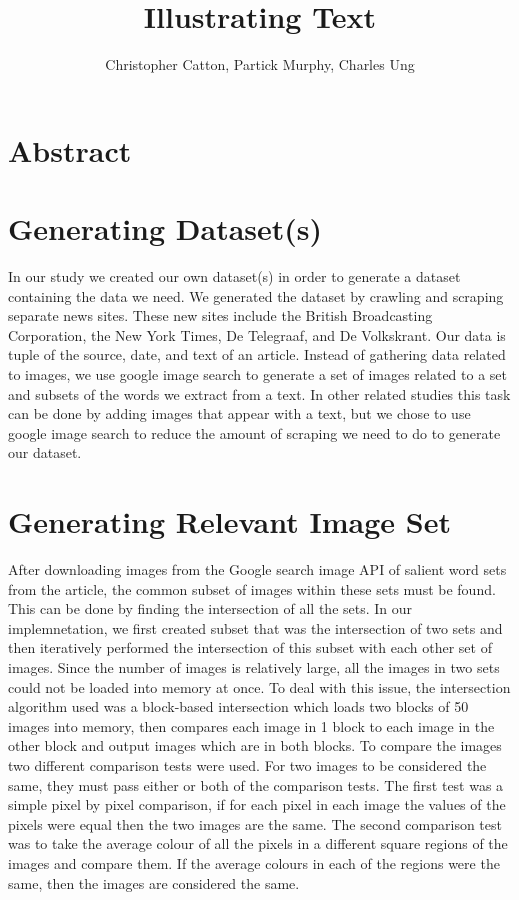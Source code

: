 \documentclass[12pt]{article}
\title{Illustrating Text}
\author{Christopher Catton, Partick Murphy, Charles Ung}
\begin{document}
\section{Abstract}
\section{Generating Dataset(s)}
In our study we created our own dataset(s) in order to generate a dataset containing the data we need. We generated the dataset by crawling and scraping separate news sites. These new sites include the British Broadcasting Corporation, the New York Times, De Telegraaf, and De Volkskrant. Our data is tuple of the source, date, and text of an article.
Instead of gathering data related to images, we use google image search to generate a set of images related to a set and subsets of the words we extract from a text. In other related studies this task can be done by adding images that appear with a text, but we chose to use google image search to reduce the amount of scraping we need to do to generate our dataset.
\section{Generating Relevant Image Set}
After downloading images from the Google search image API of salient word sets from the article, the common subset of images within these sets must be found. This can be done by finding the intersection of all the sets. In our implemnetation, we first created subset that was the intersection of two sets and then iteratively performed the intersection of this subset with each other set of images.
Since the number of images is relatively large, all the images in two sets could not be loaded into memory at once. To deal with this issue, the intersection algorithm used was a block-based intersection which loads two blocks of 50 images into memory, then compares each image in 1 block to each image in the other block and output images which are in both blocks.
To compare the images two different comparison tests were used. For two images to be considered the same, they must pass either or both of the comparison tests. The first test was a simple pixel by pixel comparison, if for each pixel in each image the values of the pixels were equal then the two images are the same. The second comparison test was to take the average colour of all the pixels in a different square regions of the images and compare them. If the average colours in each of the regions were the same, then the images are considered the same.
\end{document}
